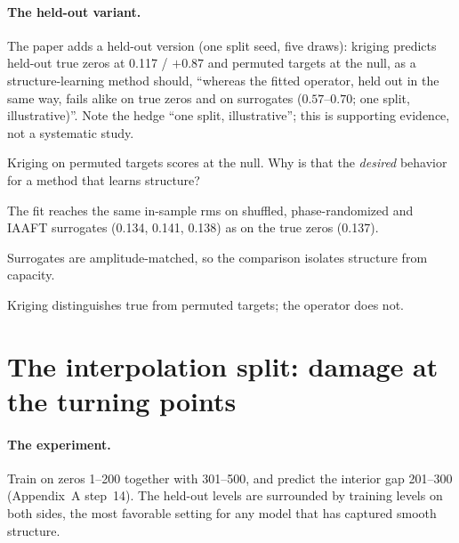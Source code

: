 \paragraph{The held-out variant.} The paper adds a held-out version (one split seed, five draws): kriging predicts held-out true zeros at 0.117 / $+0.87$ and permuted targets at the null, as a structure-learning method should, ``whereas the fitted operator, held out in the same way, fails alike on true zeros and on surrogates ($0.57$--$0.70$; one split, illustrative)''. Note the hedge ``one split, illustrative''; this is supporting evidence, not a systematic study.

\begin{checkpoint}
Kriging on permuted targets scores at the null. Why is that the \emph{desired} behavior for a method that learns structure?
\end{checkpoint}

\begin{keyideas}
\item The fit reaches the same in-sample rms on shuffled, phase-randomized and IAAFT surrogates (0.134, 0.141, 0.138) as on the true zeros (0.137).
\item Surrogates are amplitude-matched, so the comparison isolates structure from capacity.
\item Kriging distinguishes true from permuted targets; the operator does not.
\end{keyideas}

\section{The interpolation split: damage at the turning points}\label{sec:paper-memorization-gap}

\paragraph{The experiment.} Train on zeros 1--200 together with 301--500, and predict the interior gap 201--300 (Appendix~A step~14). The held-out levels are surrounded by training levels on both sides, the most favorable setting for any model that has captured smooth structure.

